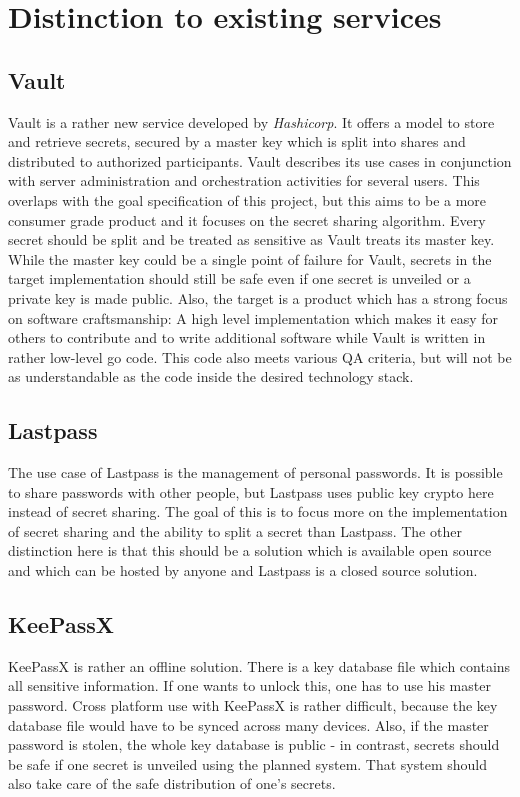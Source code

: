 \chapter{Distinction to existing services}

\section{Vault}

Vault is a rather new service developed by \textit{Hashicorp}.
It offers a model to store and retrieve secrets, secured by a
master key which is split into shares and distributed to authorized
participants. Vault describes its use cases in conjunction with
server administration and orchestration activities for several users.
This overlaps with the goal specification of this project, but this aims
to be a more
consumer grade product and it focuses on the secret sharing algorithm.
Every secret should be split and be treated
as sensitive as Vault treats its master key. While the master key
could be a single point of failure for Vault, secrets in the target implementation
should still be safe even if one secret is unveiled or a private key
is made public. Also, the target is a product which has a strong focus
on software craftsmanship: A high level implementation which
makes it easy for others to contribute and to write additional
software while Vault is written in rather low-level go code. This
code also meets various QA criteria, but will not be as understandable
as the code inside the desired technology stack.

\section{Lastpass}

The use case of Lastpass is the management of personal passwords.
It is possible to share passwords with other people, but Lastpass
uses public key crypto here instead of secret sharing. The goal of this
is to focus more on the implementation of secret sharing
and the ability to split a secret than Lastpass. The other distinction
here is that this should be a solution which is available open source and
which can be hosted by anyone and Lastpass is a closed source
solution.

\section{KeePassX}

KeePassX is rather an offline solution. There is a key database file
which contains all sensitive information. If one wants to unlock this,
one has to use his master password. Cross platform use with KeePassX is rather
difficult, because the key database file would have to be synced
across many devices. Also, if the master password is stolen, the whole
key database is public - in contrast, secrets should be safe if
one secret is unveiled using the planned system. That system should also
take care of the safe distribution of one's secrets.

